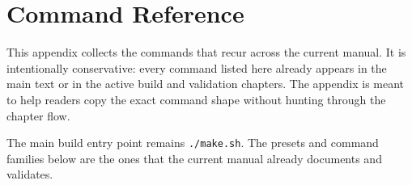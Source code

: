 \chapter{Command Reference}
\label{chap:appendix-command-reference}

This appendix collects the commands that recur across the current manual.
It is intentionally conservative: every command listed here already appears in
the main text or in the active build and validation chapters. The appendix is
meant to help readers copy the exact command shape without hunting through the
chapter flow.

The main build entry point remains \texttt{./make.sh}. The
presets and command families below are the ones that the current manual already
documents and validates.

